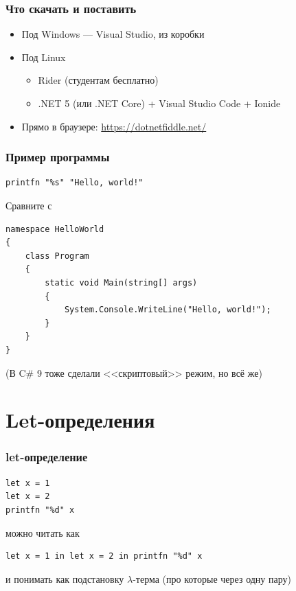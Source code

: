 \documentclass[xetex,mathserif,serif]{beamer}
\begin{document}
    \begin{frame}
        \frametitle{Что скачать и поставить}
        \begin{itemize}
            \item Под Windows --- Visual Studio, из коробки
            \item Под Linux
            \begin{itemize}
                \item Rider (студентам бесплатно)
                \item .NET 5 (или .NET Core) + Visual Studio Code + Ionide
            \end{itemize}
            \item Прямо в браузере: \url{https://dotnetfiddle.net/}
        \end{itemize}
    \end{frame}
    
    \begin{frame}[fragile]
        \frametitle{Пример программы}
        \begin{verbatim}
printfn "%s" "Hello, world!"
        \end{verbatim}
        Сравните с
        \begin{verbatim}
namespace HelloWorld
{
    class Program
    {
        static void Main(string[] args)
        {
            System.Console.WriteLine("Hello, world!");
        }
    }
}
        \end{verbatim}
        (В C\# 9 тоже сделали <<скриптовый>> режим, но всё же)
    \end{frame}

    \section{Let-определения}

    \begin{frame}[fragile]
        \frametitle{let-определение}
        \begin{verbatim}
let x = 1
let x = 2
printfn "%d" x
        \end{verbatim}
        можно читать как
        \begin{verbatim}
let x = 1 in let x = 2 in printfn "%d" x
        \end{verbatim}
        и понимать как подстановку $\lambda$-терма (про которые через одну пару)
    \end{frame}
\end{document}
